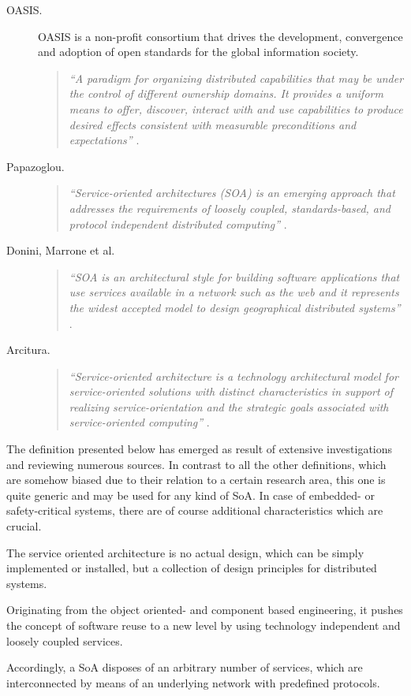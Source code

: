 \begin{description}
	\item [OASIS.]
	OASIS is a non-profit consortium that drives the development, convergence and adoption of open standards for the global information society.
	\begin{quote}
	\emph{``A paradigm for organizing distributed capabilities that may be under the control of different ownership domains. It provides a uniform means to offer, discover, interact with and use capabilities to produce desired effects consistent with measurable preconditions and expectations''} \cite{oasis2006}.
	\end{quote}

	\item [Papazoglou.]
	\begin{quote}
	\emph{``Service-oriented architectures (SOA) is an emerging approach that addresses the requirements of loosely coupled, standards-based, and protocol independent distributed computing''} \cite{papazoglou2007}.
	\end{quote}

	\item [Donini, Marrone et al.]
	\begin{quote}
	\emph{``SOA is an architectural style for building software applications that use services available in a network such as the web and it represents the widest accepted model to design geographical distributed systems''} \cite{donini2008}.
	\end{quote}

	\item [Arcitura.]
	\begin{quote}
	\emph{``Service-oriented architecture is a technology architectural model for service-oriented solutions with distinct characteristics in support of realizing service-orientation and the strategic goals associated with service-oriented computing''} \cite{arcitura}.
	\end{quote}
\end{description}

The definition presented below has emerged as result of extensive investigations and reviewing numerous sources. In contrast to all the other definitions, which are somehow biased due to their relation to a certain research area, this one is quite generic and may be used for any kind of SoA. In case of embedded- or safety-critical systems, there are of course additional characteristics which are crucial.

\begin{myquote}
	The service oriented architecture is no actual design, which can be simply implemented or installed, but a collection of design principles for distributed systems.

	Originating from the object oriented- and component based engineering, it pushes the concept of software reuse to a new level by using technology independent and loosely coupled services.

	Accordingly, a SoA disposes of an arbitrary number of services, which are interconnected by means of an underlying network with predefined protocols.
\end{myquote}

